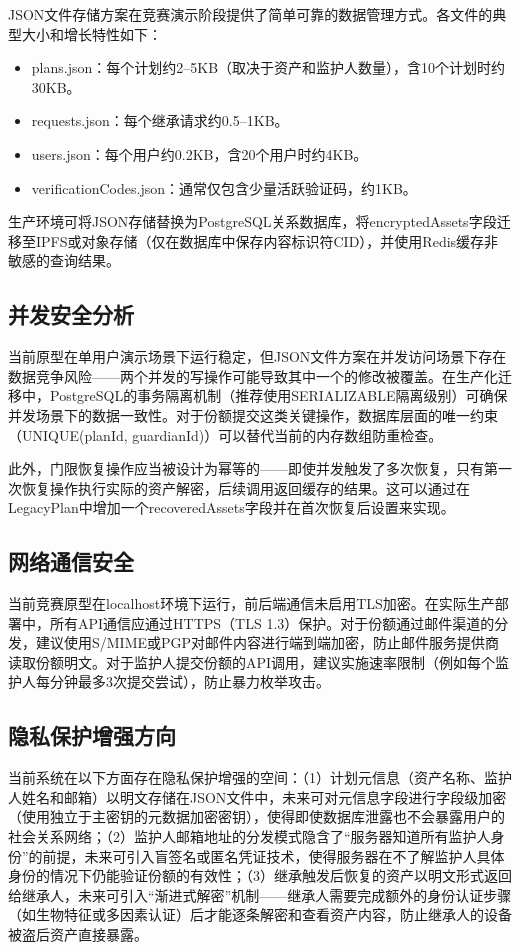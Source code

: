 \documentclass[UTF8,a4paper,zihao=-4,openany]{ctexrep}
\begin{document}
JSON文件存储方案在竞赛演示阶段提供了简单可靠的数据管理方式。各文件的典型大小和增长特性如下：

\begin{itemize}
  \item plans.json：每个计划约2--5KB（取决于资产和监护人数量），含10个计划时约30KB。
  \item requests.json：每个继承请求约0.5--1KB。
  \item users.json：每个用户约0.2KB，含20个用户时约4KB。
  \item verificationCodes.json：通常仅包含少量活跃验证码，约1KB。
\end{itemize}

生产环境可将JSON存储替换为PostgreSQL关系数据库，将encryptedAssets字段迁移至IPFS或对象存储（仅在数据库中保存内容标识符CID），并使用Redis缓存非敏感的查询结果。

\subsection{并发安全分析}

当前原型在单用户演示场景下运行稳定，但JSON文件方案在并发访问场景下存在数据竞争风险——两个并发的写操作可能导致其中一个的修改被覆盖。在生产化迁移中，PostgreSQL的事务隔离机制（推荐使用SERIALIZABLE隔离级别）可确保并发场景下的数据一致性。对于份额提交这类关键操作，数据库层面的唯一约束（UNIQUE(planId, guardianId)）可以替代当前的内存数组防重检查。

此外，门限恢复操作应当被设计为幂等的——即使并发触发了多次恢复，只有第一次恢复操作执行实际的资产解密，后续调用返回缓存的结果。这可以通过在LegacyPlan中增加一个recoveredAssets字段并在首次恢复后设置来实现。

\subsection{网络通信安全}

当前竞赛原型在localhost环境下运行，前后端通信未启用TLS加密。在实际生产部署中，所有API通信应通过HTTPS（TLS 1.3）保护。对于份额通过邮件渠道的分发，建议使用S/MIME或PGP对邮件内容进行端到端加密，防止邮件服务提供商读取份额明文。对于监护人提交份额的API调用，建议实施速率限制（例如每个监护人每分钟最多3次提交尝试），防止暴力枚举攻击。

\subsection{隐私保护增强方向}

当前系统在以下方面存在隐私保护增强的空间：（1）计划元信息（资产名称、监护人姓名和邮箱）以明文存储在JSON文件中，未来可对元信息字段进行字段级加密（使用独立于主密钥的元数据加密密钥），使得即使数据库泄露也不会暴露用户的社会关系网络；（2）监护人邮箱地址的分发模式隐含了“服务器知道所有监护人身份”的前提，未来可引入盲签名或匿名凭证技术，使得服务器在不了解监护人具体身份的情况下仍能验证份额的有效性；（3）继承触发后恢复的资产以明文形式返回给继承人，未来可引入“渐进式解密”机制——继承人需要完成额外的身份认证步骤（如生物特征或多因素认证）后才能逐条解密和查看资产内容，防止继承人的设备被盗后资产直接暴露。
\end{document}
